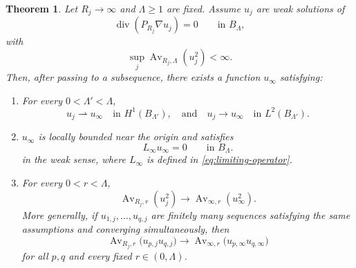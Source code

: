 \documentclass[10pt,a4paper]{amsart}
\newtheorem{theorem}{Theorem}[section]
\numberwithin{equation}{section}
\begin{document}
\begin{theorem}
\label{thm:weighted-G-compactness}
Let $R_j\to\infty$ and $\Lambda\geq 1$ are fixed. Assume $u_j$ are weak solutions of
\begin{equation}\label{eq:uj-equation}
    \operatorname{div}(P_{R_j}\nabla u_j)=0
    \qquad\text{in }B_\Lambda,
\end{equation}
with
\begin{equation}\label{eq:weighted-L2-assumption}
    \sup_j\operatorname{Av}_{R_j,\Lambda}(u_j^2)<\infty.
\end{equation}
Then, after passing to a subsequence, there exists a function $u_\infty$
satisfying:
\begin{enumerate}
\item For every $0<\Lambda'<\Lambda$,
\[
    u_j\rightharpoonup u_\infty
    \quad\text{in }H^1(B_{\Lambda'}),\quad 
    \text{and}\quad
    u_j\to u_\infty
    \quad\text{in }L^2(B_{\Lambda'}).
\]

\item  $u_\infty$ is locally bounded near the
origin and satisfies
\[
    L_\infty u_\infty=0
    \qquad\text{in }B_\Lambda.
\]
in the weak sense, where $L_{\infty}$ is defined in \cref{eq:limiting-operator}. 
\item For every $0<r<\Lambda$,
\begin{equation}\label{eq:weighted-mass-convergence}
    \operatorname{Av}_{R_j,r}(u_j^2)
    \to
    \operatorname{Av}_{\infty,r}(u_\infty^2).
\end{equation}
More generally, if
$u_{1,j},\ldots,u_{q,j}$ are finitely many sequences satisfying the
same assumptions and converging simultaneously, then
\begin{equation}\label{eq:cross-mass-convergence}
    \operatorname{Av}_{R_j,r}
    \bigl(u_{p,j}u_{q,j}\bigr)
    \to
    \operatorname{Av}_{\infty,r}
    \bigl(u_{p,\infty}u_{q,\infty}\bigr)
\end{equation}
for all $p,q$ and every fixed $r\in(0,\Lambda)$.


\end{enumerate}
\end{theorem}
\end{document}
